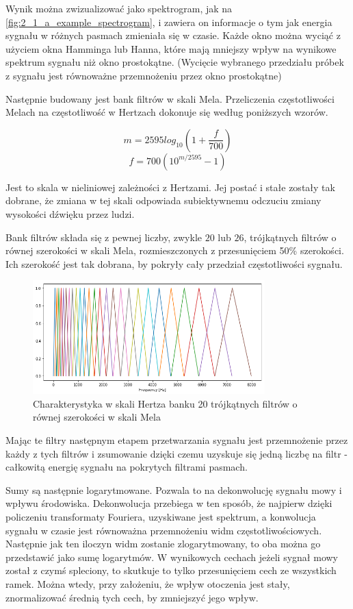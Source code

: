 Wynik  można zwizualizować jako spektrogram, jak na \ref{fig:2_1_a_example_spectrogram}, 
i zawiera on informacje o tym jak energia sygnału w różnych pasmach zmieniała się w czasie. 
Każde okno można wyciąć z użyciem okna Hamminga lub Hanna, które mają mniejszy wpływ
na wynikowe spektrum sygnału niż okno prostokątne. (Wycięcie wybranego przedziału próbek
z sygnału jest równoważne przemnożeniu przez okno prostokątne)

Następnie budowany jest bank filtrów w skali Mela. Przeliczenia częstotliwości Melach na
częstotliwość w Hertzach dokonuje się według poniższych wzorów. 

$$m = 2595 log_{10}(1 + \frac{f}{700})$$
$$f = 700 (10^{m/2595} - 1)$$

Jest to skala w nieliniowej zależności z Hertzami. Jej postać i stałe zostały tak dobrane,
że zmiana w tej skali odpowiada subiektywnemu odczuciu zmiany wysokości dźwięku przez ludzi.

Bank filtrów składa się z pewnej liczby, zwykle $20$ lub $26$, trójkątnych filtrów o równej
szerokości w skali Mela, rozmieszczonych z przesunięciem 50\% szerokości. Ich szerokość
jest tak dobrana, by pokryły cały przedział częstotliwości sygnału.

\begin{figure}[H]
    \centering
    \includegraphics[width=0.8\textwidth]{images/2_1_d_mel_filters}
    \caption{Charakterystyka w skali Hertza banku 20 trójkątnych filtrów o równej szerokości w skali Mela}
    \label{fig:2_1_d_mel_filters}
\end{figure}

Mając te filtry następnym etapem przetwarzania sygnału jest przemnożenie przez każdy z tych filtrów i zsumowanie 
dzięki czemu uzyskuje się jedną liczbę na filtr - całkowitą energię sygnału na pokrytych filtrami pasmach.

Sumy są następnie logarytmowane. Pozwala to na dekonwolucję sygnału mowy i wpływu środowiska. 
Dekonwolucja przebiega w ten sposób, że najpierw dzięki policzeniu transformaty Fouriera,
uzyskiwane jest spektrum, a konwolucja sygnału w czasie jest równoważna przemnożeniu widm częstotliwościowych.
Następnie jak ten iloczyn widm zostanie zlogarytmowany, to oba można go przedstawić jako sumę logarytmów.
W wynikowych cechach jeżeli sygnał mowy został z czymś spleciony, to skutkuje to tylko przesunięciem cech
ze wszystkich ramek. Można wtedy, przy założeniu, że wpływ otoczenia jest stały, znormalizować średnią tych cech, 
by zmniejszyć jego wpływ. 

